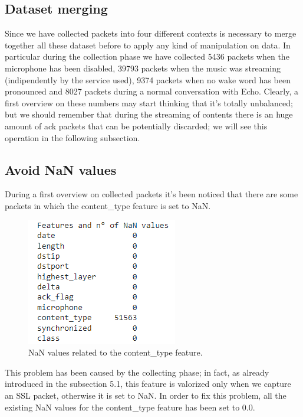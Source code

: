 \documentclass[sigconf]{acmart}
\begin{document}
    \subsection{Dataset merging}
    Since we have collected packets into four different contexts is necessary to merge together all these dataset before to apply any kind of manipulation on data. In particular during the collection phase we have collected 5436 packets when the microphone has been disabled, 39793 packets when the music was streaming (indipendently by the service used), 9374 packets when no wake word has been pronounced and 8027 packets during a normal conversation with Echo. Clearly, a first overview on these numbers may start thinking that it's totally unbalanced; but we should remember that during the streaming of contents there is an huge amount of ack packets that can be potentially discarded; we will see this operation in the following subsection.

    \subsection{Avoid NaN values}
    During a first overview on collected packets it's been noticed that there are some packets in which the content\_type feature is set to NaN.
    \begin{figure}[h!]
        \includegraphics[width=0.8\linewidth]{img/nan_values.png}
        \caption{NaN values related to the content\_type feature.}
        \label{fig:nan_values}
    \end{figure}
    This problem has been caused by the collecting phase; in fact, as already introduced in the subsection 5.1, this feature is valorized only when we capture an SSL packet, otherwise it is set to NaN. In order to fix this problem, all the existing NaN values for the content\_type feature has been set to 0.0.
\end{document}
